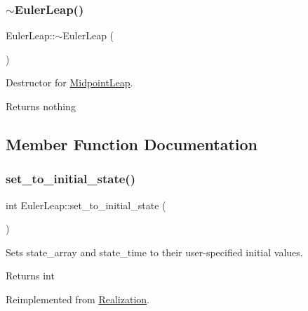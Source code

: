 \subsubsection{\texorpdfstring{$\sim$\+Euler\+Leap()}{~EulerLeap()}}
{\footnotesize\ttfamily Euler\+Leap\+::$\sim$\+Euler\+Leap (\begin{DoxyParamCaption}{ }\end{DoxyParamCaption})}



Destructor for \hyperlink{class_midpoint_leap}{Midpoint\+Leap}. 

\begin{DoxyReturn}{Returns}
nothing 
\end{DoxyReturn}


\subsection{Member Function Documentation}
\mbox{\label{class_euler_leap_a1a13929ea1ebf40e7357439968828f4b}} 
\subsubsection{\texorpdfstring{set\+\_\+to\+\_\+initial\+\_\+state()}{set\_to\_initial\_state()}}
{\footnotesize\ttfamily int Euler\+Leap\+::set\+\_\+to\+\_\+initial\+\_\+state (\begin{DoxyParamCaption}{ }\end{DoxyParamCaption})\hspace{0.3cm}{\ttfamily [virtual]}}



Sets state\+\_\+array and state\+\_\+time to their user-\/specified initial values. 

\begin{DoxyReturn}{Returns}
int 
\end{DoxyReturn}


Reimplemented from \hyperlink{class_realization_a391a89af7574a9053f53f8a299c2cc70}{Realization}.

\mbox{\label{class_euler_leap_a25b1ea90a95bfd41ecb919605683da9d}} 
